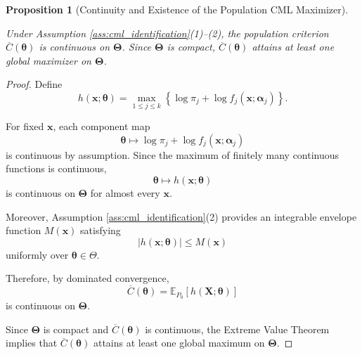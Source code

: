 \documentclass[pdflatex,sn-mathphys-ay]{sn-jnl}%
\let\oldtheta\theta
\renewcommand{\theta}{\boldsymbol{\oldtheta}}
\let\oldalpha\alpha
\renewcommand{\alpha}{\boldsymbol{\oldalpha}}
\theoremstyle{thmstyleone}%
\newtheorem{proposition}{Proposition}%
\theoremstyle{thmstyletwo}%
\theoremstyle{thmstylethree}%
\begin{document}
\begin{proposition}[Continuity and Existence of the Population CML Maximizer]
\label{prop:cml_continuity}

Under Assumption \ref{ass:cml_identification}(1)--(2), the population criterion 
$ \overline{C}(\boldsymbol{\theta})$ is continuous on $\boldsymbol{\Theta}$. Since $\boldsymbol{\Theta}$ is compact, $\overline{C}(\boldsymbol{\theta})$ attains at least one global maximizer on $\boldsymbol{\Theta}$.

\end{proposition}

\begin{proof}

Define
\[
    h(\mathbf{x};\boldsymbol{\theta})
    =
    \max_{1 \leq j \leq k}
    \left\{
        \log \pi_j
        +
        \log f_j(\mathbf{x};\boldsymbol{\alpha}_j)
    \right\}.
\]

For fixed $\mathbf{x}$, each component map
\[
    \boldsymbol{\theta}
    \mapsto
    \log \pi_j
    +
    \log f_j(\mathbf{x};\boldsymbol{\alpha}_j)
\]
is continuous by assumption. Since the maximum of finitely many continuous functions is continuous,
\[
    \boldsymbol{\theta}
    \mapsto
    h(\mathbf{x};\boldsymbol{\theta})
\]
is continuous on $\boldsymbol{\Theta}$ for almost every $\mathbf{x}$.

Moreover, Assumption
\ref{ass:cml_identification}(2) provides an integrable envelope function $M(\mathbf{x})$ satisfying
\[
    |h(\mathbf{x};\boldsymbol{\theta})|
    \leq
    M(\mathbf{x})
\]
uniformly over $\boldsymbol{\theta}\in\Theta$.


Therefore, by dominated convergence,
\[
    \overline{C}(\boldsymbol{\theta})
    =
    \mathbb{E}_{P_0}
    \left[
        h(\mathbf{X};\boldsymbol{\theta})
    \right]
\]
is continuous on $\boldsymbol{\Theta}$.

Since $\boldsymbol{\Theta}$ is compact and $ \overline{C}(\boldsymbol{\theta})$ is continuous, the Extreme Value Theorem \citep{rudin1976principles} implies that $ \overline{C}(\boldsymbol{\theta})$ attains at least one global maximum on $\boldsymbol{\Theta}$.

\end{proof}
\end{document}
